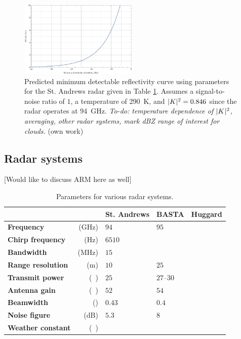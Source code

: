 \documentclass{article}
\DeclarePairedDelimiter\abs{\lvert}{\rvert}%
\begin{document}
\begin{figure}
	\centering
	\includegraphics[width=0.5\textwidth]{sensitivity}
	\caption{Predicted minimum detectable reflectivity curve using parameters for the St. Andrews radar given in Table \ref{tbl:RadarSystems}. Assumes a signal-to-noise ratio of \(1\), a temperature of \SI{290}{\kelvin}, and \(\abs{K}^2 = 0.846\)\supercite{ComplexIndexOfRefraction} since the radar operates at \SI{94}{\giga\hertz}. \textit{To-do: temperature dependence of \(\abs{K}^2\), averaging, other radar systems, mark dBZ range of interest for clouds.} (own work)}
	\label{fig:Sensitivity}
\end{figure}

\subsection{Radar systems}
[Would like to discuss ARM here as well]

\begin{table}
	\begin{tabular}{lr|l|l|l}     & & St. Andrews\supercite{StAndrewsRadar} & BASTA\supercite{BASTA} & Huggard\supercite{HuggardRadar} \\
		\midrule
		\textbf{Frequency}        & (\si{\giga\hertz})    & \(94\)   & \(95\) & \\
		\textbf{Chirp frequency}  & (\si{\hertz})         & \(6510\) & \(\) & \\
		\textbf{Bandwidth}        & (\si{\mega\hertz})    & \(15\)   & \(\) & \\
		\textbf{Range resolution} & (\si{\metre})         & \(10\)   & \(25\) & \\

		\textbf{Transmit power}   & (\si{\deci\belm})     & \(25\)   & \(27\)--\(30\) & \\
		\textbf{Antenna gain}     & (\si{\deci\beli})     & \(52\)   & \(54\) & \\
		\textbf{Beamwidth}        & (\degree)             & \(0.43\) & \(0.4\) & \\

		\textbf{Noise figure}     & (\si{\deci\bel})      & \(5.3\)  & \(8\) &  \\
		
		\textbf{Weather constant} & (\si{\deci\belm})     & \(\)     & & \\
	\end{tabular}
	\caption{Parameters for various radar systems.}
	\label{tbl:RadarSystems}
\end{table}
\end{document}
